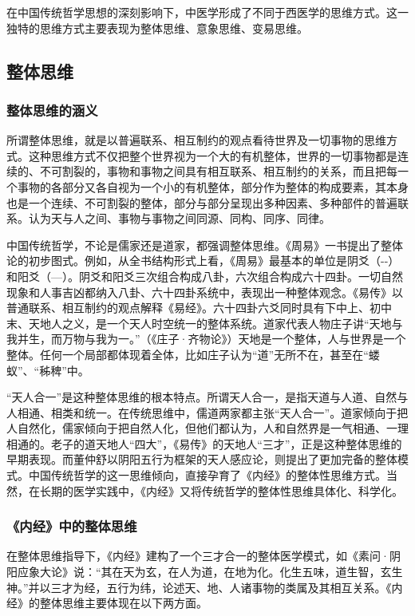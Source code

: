 \documentclass[draft,12pt]{ctexbook}
\begin{document}
在中国传统哲学思想的深刻影响下，中医学形成了不同于西医学的思维方式。这一独特的思维方式主要表现为整体思维、意象思维、变易思维。

\subsection{整体思维}%

\subsubsection{整体思维的涵义}%

所谓整体思维，就是以普遍联系、相互制约的观点看待世界及一切事物的思维方式。这种思维方式不仅把整个世界视为一个大的有机整体，世界的一切事物都是连续的、不可割裂的，事物和事物之间具有相互联系、相互制约的关系，而且把每一个事物的各部分又各自视为一个小的有机整体，部分作为整体的构成要素，其本身也是一个连续、不可割裂的整体，部分与部分呈现出多种因素、多种部件的普遍联系。认为天与人之间、事物与事物之间同源、同构、同序、同律。

中国传统哲学，不论是儒家还是道家，都强调整体思维。《周易》一书提出了整体论的初步图式。例如，从全书结构形式上看，《周易》最基本的单位是阴爻（-{-}）和阳爻（—）。阴爻和阳爻三次组合构成八卦，六次组合构成六十四卦。一切自然现象和人事吉凶都纳入八卦、六十四卦系统中，表现出一种整体观念。《易传》以普通联系、相互制约的观点解释《易经》。六十四卦六爻同时具有下中上、初中末、天地人之义，是一个天人时空统一的整体系统。道家代表人物庄子讲“天地与我并生，而万物与我为一。”（《庄子·齐物论》）天地是一个整体，人与世界是一个整体。任何一个局部都体现着全体，比如庄子认为“道”无所不在，甚至在“蝼蚁”、“秭稗”中。

“天人合一”是这种整体思维的根本特点。所谓天人合一，是指天道与人道、自然与人相通、相类和统一。在传统思维中，儒道两家都主张“天人合一”。道家倾向于把人自然化，儒家倾向于把自然人化，但他们都认为，人和自然界是一气相通、一理相通的。老子的道天地人“四大”，《易传》的天地人“三才”，正是这种整体思维的早期表现。而董仲舒以阴阳五行为框架的天人感应论，则提出了更加完备的整体模式。中国传统哲学的这一思维倾向，直接孕育了《内经》的整体性思维方式。当然，在长期的医学实践中，《内经》又将传统哲学的整体性思维具体化、科学化。

\subsubsection{《内经》中的整体思维}%

在整体思维指导下，《内经》建构了一个三才合一的整体医学模式，如《素问·阴阳应象大论》说：“其在天为玄，在人为道，在地为化。化生五味，道生智，玄生神。”并以三才为经，五行为纬，论述天、地、人诸事物的类属及其相互关系。《内经》的整体思维主要体现在以下两方面。
\end{document}
